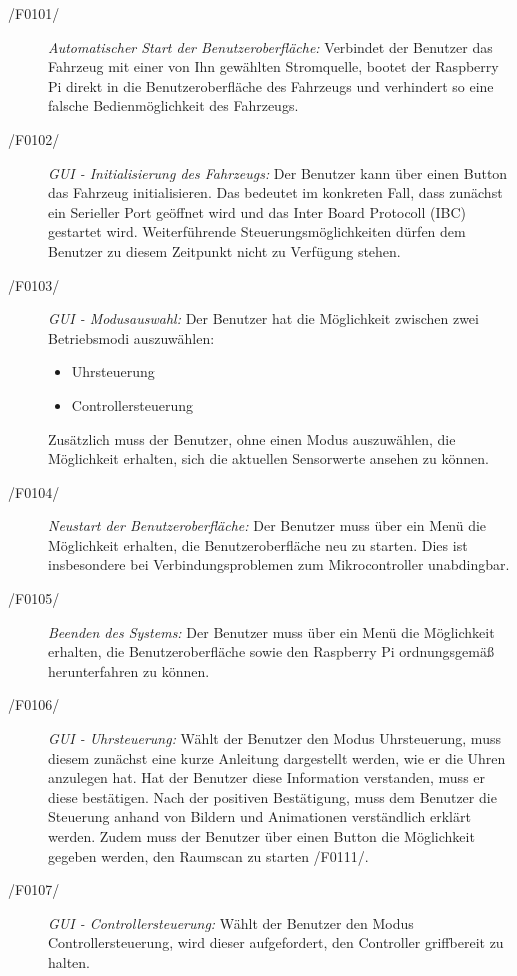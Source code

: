 \begin{description}
  \item[/F0101/]
    \textit{Automatischer Start der Benutzeroberfläche:}
	Verbindet der Benutzer das Fahrzeug mit einer von Ihn gewählten Stromquelle, 
	bootet der Raspberry Pi direkt in die Benutzeroberfläche des Fahrzeugs und verhindert so eine falsche Bedienmöglichkeit des Fahrzeugs.
  \item[/F0102/]
    \textit{GUI - Initialisierung des Fahrzeugs:}
	Der Benutzer kann über einen Button das Fahrzeug initialisieren. Das bedeutet im konkreten Fall, 
	dass zunächst ein Serieller Port geöffnet wird und das Inter Board Protocoll (IBC) gestartet wird. 
	Weiterführende Steuerungsmöglichkeiten dürfen dem Benutzer zu diesem Zeitpunkt nicht zu Verfügung stehen.
  \item[/F0103/]
	\textit{GUI - Modusauswahl:}
	Der Benutzer hat die Möglichkeit zwischen zwei Betriebsmodi auszuwählen:
	\begin{itemize}
		\item Uhrsteuerung
		\item Controllersteuerung
	  \end{itemize}
	Zusätzlich muss der Benutzer, ohne einen Modus auszuwählen, die Möglichkeit erhalten, sich die aktuellen Sensorwerte ansehen zu können.
  \item[/F0104/]
  \textit{Neustart der Benutzeroberfläche:}
  Der Benutzer muss über ein Menü die Möglichkeit erhalten, die Benutzeroberfläche neu zu starten.
  Dies ist insbesondere bei Verbindungsproblemen zum Mikrocontroller unabdingbar.
  \item[/F0105/]
  \textit{Beenden des Systems:}
  Der Benutzer muss über ein Menü die Möglichkeit erhalten, die Benutzeroberfläche sowie den Raspberry Pi ordnungsgemäß herunterfahren zu können.
  \item[/F0106/]
  \textit{GUI - Uhrsteuerung:}
  Wählt der Benutzer den Modus Uhrsteuerung, muss diesem zunächst eine kurze Anleitung dargestellt werden, 
  wie er die Uhren anzulegen hat. Hat der Benutzer diese Information verstanden, muss er diese bestätigen.
  Nach der positiven Bestätigung, muss dem Benutzer die Steuerung anhand von Bildern und Animationen verständlich erklärt werden. 
  Zudem muss der Benutzer über einen Button die Möglichkeit gegeben werden, den Raumscan zu starten /F0111/.
  \item[/F0107/]
  \textit{GUI - Controllersteuerung: }
  Wählt der Benutzer den Modus Controllersteuerung, wird dieser aufgefordert, den Controller griffbereit zu halten. 

\end{description}
